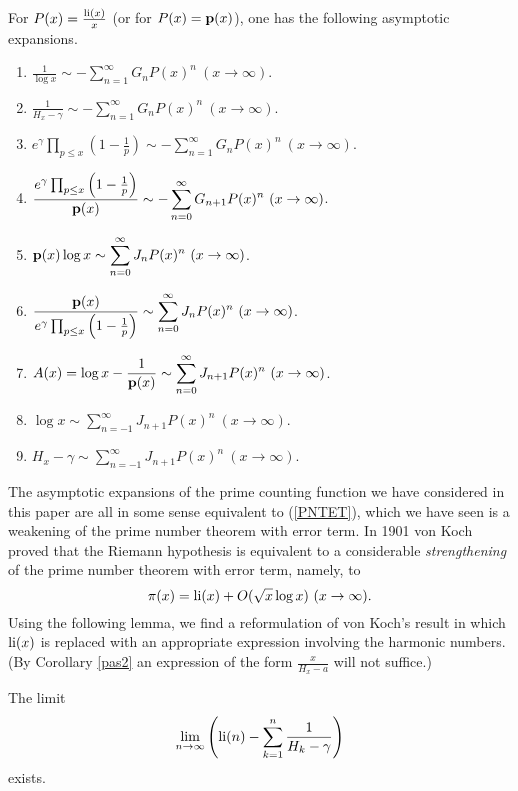 \documentclass[12pt]{article}
\begin{document}
\begin{corollary}
For $P(x) = \frac{\operatorname{li}(x)}{x}$ (or for $P(x) = {\mathbf p}(x)$), one has the following asymptotic expansions.
\begin{enumerate}
\item $\displaystyle \frac{1}{\log x} \sim -\sum_{n = 1}^\infty G_n P(x)^n \ (x \to \infty)$.
\item $\displaystyle \frac{1}{H_x-\gamma} \sim -\sum_{n = 1}^\infty G_n P(x)^n \ (x \to \infty)$.
\item $\displaystyle e^{\gamma} \prod_{p \leq x}\left(1-\frac{1}{p}\right) \sim -\sum_{n = 1}^\infty G_n P(x)^n \ (x \to \infty)$.
\item $\displaystyle \frac{e^{\gamma} \prod_{p \leq x}\left(1-\frac{1}{p}\right) }{{\mathbf p}(x)} \sim -\sum_{n = 0}^\infty G_{n+1} P(x)^n \ (x \to \infty)$.
\item $\displaystyle {\mathbf p}(x) \log x\sim \sum_{n = 0}^\infty J_n P(x)^n \ (x \to \infty)$.
\item $\displaystyle \frac{{\mathbf p}(x)}{ e^{\gamma} \prod_{p \leq x}\left(1-\frac{1}{p}\right)} \sim \sum_{n = 0}^\infty J_n P(x)^n \ (x \to \infty)$.
\item $\displaystyle A(x) = \log x - \frac{1}{{\mathbf p}(x)}  \sim \sum_{n = 0}^\infty J_{n+1} P(x)^n \ (x \to \infty)$.
\item $\displaystyle \log x   \sim \sum_{n = -1}^\infty J_{n+1} P(x)^n \ (x \to \infty)$.
\item $\displaystyle H_x-\gamma  \sim \sum_{n = -1}^\infty J_{n+1} P(x)^n \ (x \to \infty)$.
\end{enumerate}
\end{corollary}



The asymptotic expansions of the prime counting function we have considered in this paper are all in some sense equivalent to (\ref{PNTET}), which we have seen is a weakening of the prime number theorem with error term.  In 1901 von Koch proved \cite{koch} that the  Riemann hypothesis is equivalent to a considerable {\it strengthening} of the prime number theorem with error term, namely, to
$$\pi(x) = \operatorname{li}(x) + O(\sqrt{x}\log x) \ (x \to \infty).$$
Using the following lemma, we find a  reformulation of von Koch's result in which $\operatorname{li}(x)$ is replaced with an appropriate expression involving the harmonic numbers.   (By Corollary \ref{pas2} an expression of the form $\frac{x}{H_x-a}$ will not suffice.) 

\begin{lemma}\label{limlem}
The limit
$$\lim_{n \to \infty} \left(\operatorname{li}(n) - \sum_{k = 1}^n\frac{1}{H_k-\gamma}\right)$$
exists.
\end{lemma}
\end{document}
